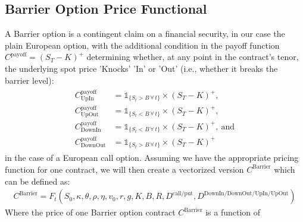 \documentclass[11pt]{article}
\begin{document}
	\subsection{Barrier Option Price Functional}
		\vfill
		A Barrier option is a contingent claim on a financial security, in our case the plain European option, with the additional condition in the payoff function $C^{\text{payoff}} = (S_{T}-K)^{+}$ determining whether, at any point in the contract's tenor, the underlying spot price 'Knocks' 'In' or 'Out' (i.e., whether it breaks the barrier level):
		\vfill
		\begin{align}
			\begin{aligned}
				C^{\text{payoff}}_{\text{UpIn}} &= \mathbb{1}_{\{ S_t > B \,\forall\, t \}} \times (S_{T}-K)^{+}, \\
				C^{\text{payoff}}_{\text{UpOut}} &= \mathbb{1}_{\{ S_t < B \,\forall\, t \}} \times (S_{T}-K)^{+}, \\
				C^{\text{payoff}}_{\text{DownIn}} &= \mathbb{1}_{\{ S_t < B \,\forall\, t \}} \times (S_{T}-K)^{+}, \: \text{and} \\
				C^{\text{payoff}}_{\text{DownOut}} &= \mathbb{1}_{\{ S_t > B \,\forall\, t \}} \times (S_{T}-K)^{+}
			\end{aligned}
			\label{eq:BarrierPayoffs}
		\end{align}
		\vfill
		in the case of a European call option. Assuming we have the appropriate pricing function for one contract, we will then create a vectorized version $C^{\text{Barrier}}$ which can be defined as:
		\vfill
		\begin{align}
			C^{\text{Barrier}} = F_{t}(S_0, \kappa, \theta, \rho, \eta, v_{0}, r, g, K, B, R, D^{\text{call/put}}, D^{\text{DownIn/DownOut/UpIn/UpOut}}) \label{eq:Cbarrier}
		\end{align}
		\vfill
		Where the price of one Barrier option contract $C^{\text{Barrier}}$ is a function of
\end{document}
